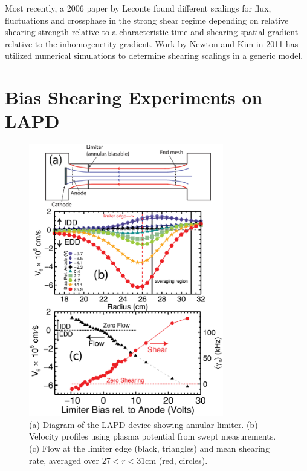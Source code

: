 \documentclass[aip,pop,amsmath,amssymb,reprint,superscriptaddress]{revtex4-1} %
\begin{document}
Most recently, a 2006 paper by Leconte found different scalings for flux, fluctuations and crossphase in the strong shear regime depending on relative shearing strength relative to a characteristic time and shearing spatial gradient relative to the inhomogenetity gradient. Work by Newton and Kim in 2011 has utilized numerical simulations to determine shearing scalings in a generic model.

\section{Bias Shearing Experiments on LAPD}

\begin{figure}[!htbp]
\centerline{
\includegraphics[width=8.5cm]{figure1.eps}}
\caption{\label{fig:velocity_flowshear} (a) Diagram of the LAPD device showing annular limiter.  (b) Velocity profiles using plasma potential from swept measurements. (c) Flow at the limiter edge (black, triangles) and mean shearing rate, averaged over $27 < r < 31$cm (red, circles).}
\end{figure}
\end{document}
